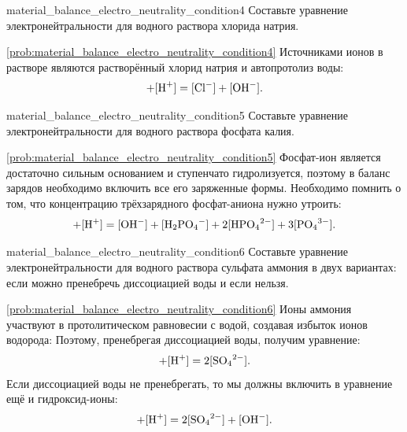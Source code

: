 \begin{problem}{}{material_balance_electro_neutrality_condition4}
    Составьте уравнение электронейтральности для водного раствора хлорида натрия.
    \begin{sol}{\ref{prob:material_balance_electro_neutrality_condition4}}
        Источниками ионов в растворе являются растворённый хлорид натрия и автопротолиз воды:
        \begin{equation*}
            [\ce{Na^+}] + [\ce{H^+}] = [\ce{Cl^-}] + [\ce{OH^-}].
        \end{equation*}
    \end{sol}
\end{problem}

\begin{problem}{}{material_balance_electro_neutrality_condition5}
    Составьте уравнение электронейтральности для водного раствора фосфата калия.
    \begin{sol}{\ref{prob:material_balance_electro_neutrality_condition5}}
        Фосфат-ион является достаточно сильным основанием и ступенчато гидролизуется, поэтому в баланс зарядов необходимо включить все его заряженные формы. Необходимо помнить о том, что концентрацию трёхзарядного фосфат-аниона нужно утроить:
        \begin{equation*}
            [\ce{K^+}] + [\ce{H^+}] = [\ce{OH^-}] + [\ce{H2PO4^-}] + 2[\ce{HPO4^{2-}}] + 3[\ce{PO4^{3-}}].
        \end{equation*}
    \end{sol}
\end{problem}

\begin{problem}{}{material_balance_electro_neutrality_condition6}
    Составьте уравнение электронейтральности для водного раствора сульфата аммония в двух вариантах: если можно пренебречь диссоциацией воды и если нельзя.
    \begin{sol}{\ref{prob:material_balance_electro_neutrality_condition6}}
        Ионы аммония участвуют в протолитическом равновесии с водой, создавая избыток ионов водорода:
        Поэтому, пренебрегая диссоциацией воды, получим уравнение:
        \begin{equation*}
            [\ce{NH4^+}] + [\ce{H^+}] = 2[\ce{SO4^{2-}}].
        \end{equation*}
        Если диссоциацией воды не пренебрегать, то мы должны включить в уравнение ещё и гидроксид-ионы:
        \begin{equation*}
            [\ce{NH4^+}] + [\ce{H^+}] = 2[\ce{SO4^{2-}}] + [\ce{OH^-}].
        \end{equation*}
    \end{sol}
\end{problem}

